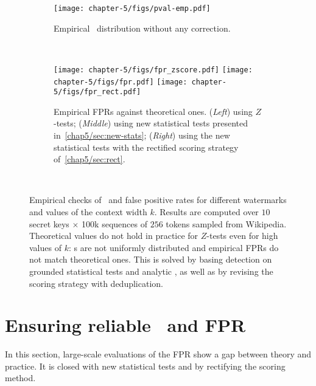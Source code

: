 



\begin{figure}[b!]
    \centering
    \begin{subfigure}{0.8\textwidth}
        \texttt{[image: chapter-5/figs/pval-emp.pdf]}
        \vspace{-0.6cm}
        \caption{Empirical \pval\ distribution without any correction.}
        \label{chap5/fig:pvalue}
    \end{subfigure}
    \\[0.5cm]
    \centering
    \begin{subfigure}{1.0\textwidth}
        \texttt{[image: chapter-5/figs/fpr\_zscore.pdf]}
        \texttt{[image: chapter-5/figs/fpr.pdf]}
        \texttt{[image: chapter-5/figs/fpr\_rect.pdf]}
        \caption{
            Empirical FPRs against theoretical ones.
            (\emph{Left}) using $Z$-tests;
            (\emph{Middle}) using new statistical tests presented in~\ref{chap5/sec:new-stats};
            (\emph{Right}) using the new statistical tests with the rectified scoring strategy of~\ref{chap5/sec:rect}.
        }\label{chap5/fig:fpr}
    \end{subfigure} \\
    \caption{
        Empirical checks of \pval\ and false positive rates for different watermarks and values of the context width $k$.
        Results are computed over $10$ secret keys $\times$ 100k sequences of $256$ tokens sampled from Wikipedia.
        Theoretical values do not hold in practice for $Z$-tests even for high values of $k$: \pval s are not uniformly distributed and empirical FPRs do not match theoretical ones.
        This is solved by basing detection on grounded statistical tests and analytic \pval, as well as by revising the scoring strategy with deduplication.
    }
\end{figure}


\section{Ensuring reliable \pval\ and FPR}\label{chap5/sec:stats}

In this section, large-scale evaluations of the FPR show a gap between theory and practice. 
It is closed with new statistical tests and by rectifying the scoring method.



